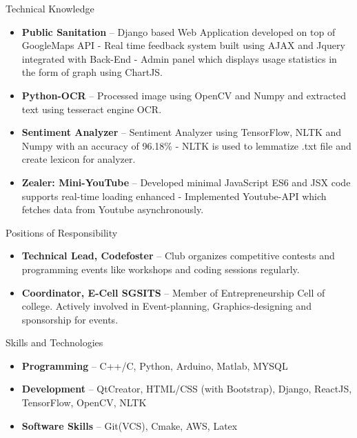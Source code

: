 \documentclass[]{mcdowellcv}
\begin{document}
	\begin{cvsection}{Technical Knowledge}{}{}    \begin{cvsubsection}{}{}{}
			\begin{itemize}
			    
			    \item \textbf{Public Sanitation} -- Django based Web Application developed on top of GoogleMaps API - Real time feedback system built using AJAX and Jquery integrated with Back-End - Admin panel which displays usage statistics in the form of graph using ChartJS.
			    
				\item \textbf{Python-OCR} -- Processed image using OpenCV and Numpy and extracted text using tesseract engine OCR.
				
	    		\item \textbf{Sentiment Analyzer} -- Sentiment Analyzer using TensorFlow, NLTK and Numpy with an accuracy of 96.18\% - NLTK is used to lemmatize .txt file and create lexicon for analyzer.
			    
			    \item \textbf{Zealer: Mini-YouTube} -- Developed minimal JavaScript ES6 and JSX code supports real-time loading enhanced - Implemented Youtube-API which fetches data from Youtube asynchronously.
			    
			\end{itemize}
		\end{cvsubsection}
	\end{cvsection}
	
	\begin{cvsection}{Positions of Responsibility}
		\begin{cvsubsection}{}{}{}	
			\begin{itemize}
				\item \textbf{Technical Lead, Codefoster} -- Club organizes competitive contests and programming events like workshops and coding sessions regularly.
			    \item \textbf{Coordinator, E-Cell SGSITS} -- Member of Entrepreneurship Cell of college. Actively involved in Event-planning, Graphics-designing and sponsorship for events.
			\end{itemize}
		\end{cvsubsection}
	\end{cvsection}
	
	\begin{cvsection}{Skills and Technologies}
		\begin{cvsubsection}{}{}{}	
			\begin{itemize}
				\item \textbf{Programming} -- C++/C, Python, Arduino, Matlab, MYSQL
				\item \textbf{Development} -- QtCreator, HTML/CSS (with Bootstrap), Django, ReactJS, TensorFlow, OpenCV, NLTK
			    \item \textbf{Software Skills} -- Git(VCS), Cmake, AWS, Latex
			\end{itemize}
		\end{cvsubsection}
	\end{cvsection}
	
\end{document}
